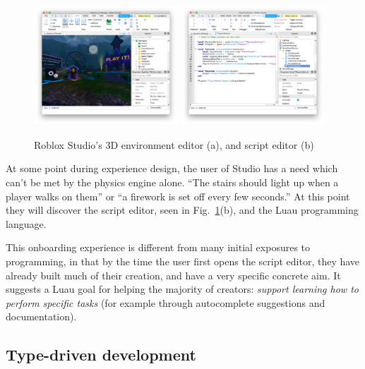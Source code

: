 \documentclass[acmsmall]{acmart}
\begin{document}
\begin{figure}
\includegraphics[width=0.48\textwidth]{studio-mow.png}
\includegraphics[width=0.48\textwidth]{studio-script-editor.png}
\caption{Roblox Studio's 3D environment editor (a), and script editor (b)}
\label{fig:studio}
\end{figure}

At some point during experience design, the user of Studio has a need
which can't be met by the physics engine alone. ``The stairs should
light up when a player walks on them'' or ``a firework is set off
every few seconds.'' At this point they will discover the script
editor, seen in Fig.~\ref{fig:studio}(b), and the Luau programming language.

This onboarding experience is different from many initial exposures to
programming, in that by the time the user first opens the script
editor, they have already built much of their creation, and have a
very specific concrete aim.  It suggests a Luau goal for helping the
majority of creators: \emph{support learning how to perform specific
tasks} (for example through autocomplete suggestions and
documentation).

\subsection{Type-driven development}
\end{document}
